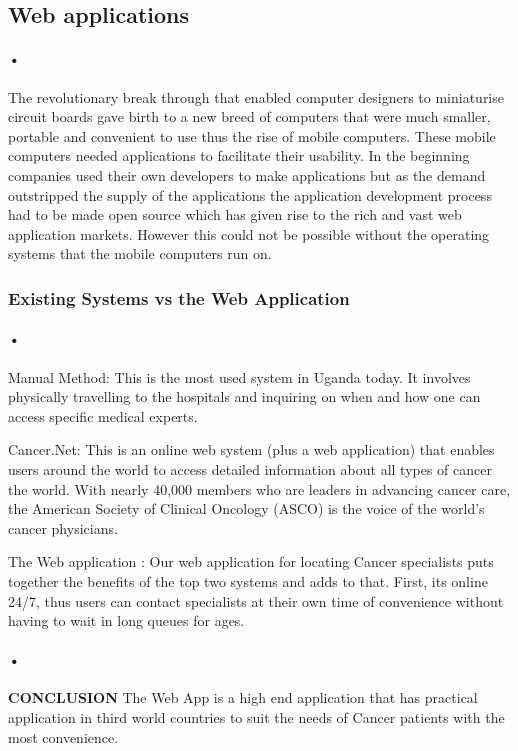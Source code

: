 \documentclass[12pt]{article}
\begin{document}
\subsection{Web applications} 
\paragraph{•}The revolutionary break through that enabled computer designers to miniaturise circuit boards gave birth to a new breed of computers that were much smaller, portable and convenient to use thus the rise of mobile computers. These mobile computers needed applications to facilitate their usability. In the beginning companies used their own developers to make applications but as the demand outstripped the supply of the applications the application development process had to be made open source which has given rise to the rich and vast web application markets. However this could not be possible without the operating systems that the mobile computers run on.

\subsubsection{Existing Systems vs the Web Application}
\paragraph{•}Manual Method: This is the most used system in Uganda today. It involves physically travelling to the hospitals and inquiring on when and how one can access specific medical experts. 

Cancer.Net: This is an online web system (plus a web application) that enables users around the world to access detailed information about all types of cancer the world. With nearly 40,000 members who are leaders in advancing cancer care, the American Society of Clinical Oncology (ASCO) is the voice of the world’s cancer physicians.

The Web application : Our web application for locating Cancer specialists puts together the benefits of the top two systems and adds to that. First, its online 24/7, thus users can contact specialists at their own time of convenience without having to wait in long queues for ages. 


\paragraph{•}\textbf{CONCLUSION}
The Web App is a high end application that has practical application in third world countries to suit the needs of Cancer patients with the most convenience.
\end{document}
